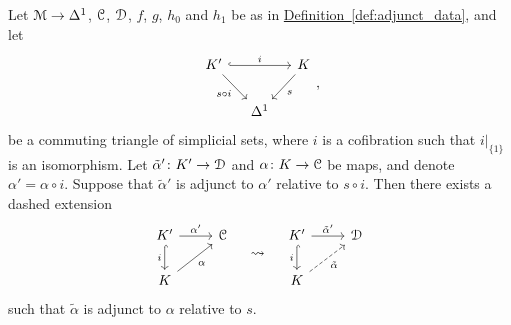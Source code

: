 \documentclass[main.tex]{subfiles}
\begin{document}
\begin{proposition}
  \label{prop:can_transport_adjunct_data}
  Let $\mathcal{M} \to \Delta^{1}$, $\mathcal{C}$, $\mathcal{D}$, $f$, $g$, $h_{0}$ and $h_{1}$ be as in \hyperref[def:adjunct_data]{Definition~\ref*{def:adjunct_data}}, and let
  \begin{equation*}
    \begin{tikzcd}[column sep=small]
      K'
      \arrow[rr, hook, "i"]
      \arrow[dr, swap, "s \circ i"]
      && K
      \arrow[dl, "s"]
      \\
      & \Delta^{1}
    \end{tikzcd},
  \end{equation*}
  be a commuting triangle of simplicial sets, where $i$ is a cofibration such that $i|_{\{1\}}$ is an isomorphism. Let $\tilde{\alpha}'\colon K' \to \mathcal{D}$ and $\alpha\colon K \to \mathcal{C}$ be maps, and denote $\alpha' = \alpha \circ i$. Suppose that $\tilde{\alpha}'$ is adjunct to $\alpha'$ relative to $s \circ i$. Then there exists a dashed extension
  \begin{equation}
    \label{eq:adjunct_filling_problems}
    \begin{tikzcd}
      K'
      \arrow[r, "\alpha'"]
      \arrow[d, swap, hook, "i"]
      & \category{C}
      \\
      K
      \arrow[ur, swap, "\alpha"]
    \end{tikzcd}
    \quad \rightsquigarrow \quad
    \begin{tikzcd}
      K'
      \arrow[r, "\tilde{\alpha}'"]
      \arrow[d, swap, hook, "i"]
      & \category{D}
      \\
      K
      \arrow[ur, dashed, swap, "\tilde{\alpha}"]
    \end{tikzcd}
  \end{equation}
  such that $\tilde{\alpha}$ is adjunct to $\alpha$ relative to $s$.

\end{proposition}
\end{document}
